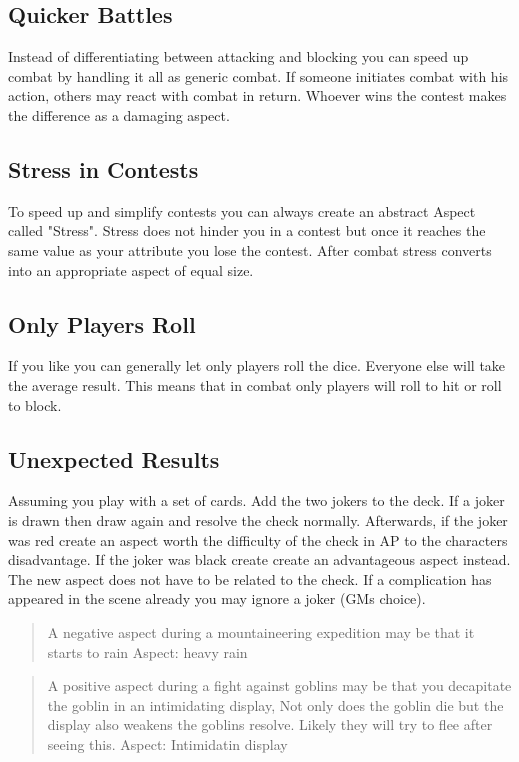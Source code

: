 \documentclass[11pt]{article}
\begin{document}
{\subsection{Quicker Battles}
\label{sec:orgdccf61f}

Instead of differentiating between attacking and blocking you can speed up combat by handling it all as generic combat. If someone initiates combat with his action, others may react with combat in return. Whoever wins the contest makes the difference as a damaging aspect.

\subsection{Stress in Contests}
\label{sec:orgca5242b}

To speed up and simplify contests you can always create an abstract Aspect called "Stress". Stress does not hinder you in a contest but once it reaches the same value as your attribute you lose the contest. After combat stress converts into an appropriate aspect of equal size.

\subsection{Only Players Roll}
\label{sec:org804b99a}
If you like you can generally let only players roll the dice. Everyone else will take the average result. This means that in combat only players will roll to hit or roll to block.

\subsection{Unexpected Results}
\label{sec:org841d25f}
Assuming you play with a set of cards. Add the two jokers to the deck. If a joker is drawn then draw again and resolve the check normally. Afterwards, if the joker was red create an aspect worth the difficulty of the check in AP to the characters disadvantage. If the joker was black create create an advantageous aspect instead. The new aspect does not have to be related to the check.
If a complication has appeared in the scene already you may ignore a joker (GMs choice).

\begin{quote}
A negative aspect during a mountaineering expedition may be that it starts to rain
Aspect: heavy rain
\end{quote}

\begin{quote}
A positive aspect during a fight against goblins may be that you decapitate the goblin in an intimidating display, Not only does the goblin die but the display also weakens the goblins resolve. Likely they will try to flee after seeing this.
Aspect: Intimidatin display
\end{quote}

}
\end{document}
